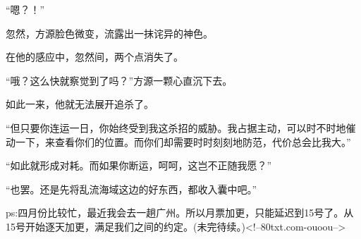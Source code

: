 \begin{this_body}
“嗯？！”

忽然，方源脸色微变，流露出一抹诧异的神色。

在他的感应中，忽然间，两个点消失了。

“哦？这么快就察觉到了吗？”方源一颗心直沉下去。

如此一来，他就无法展开追杀了。

“但只要你连运一日，你始终受到我这杀招的威胁。我占据主动，可以时不时地催动一下，来查看你们的位置。而你们却需要时时刻刻地防范，代价总会比我大。”

“如此就形成对耗。而如果你断运，呵呵，这岂不正随我愿？”

“也罢。还是先将乱流海域这边的好东西，都收入囊中吧。”

ps:四月份比较忙，最近我会去一趟广州。所以月票加更，只能延迟到15号了。从15号开始逐天加更，满足我们之间的约定。(未完待续。)<!--80txt.com-ouoou-->

\end{this_body}

